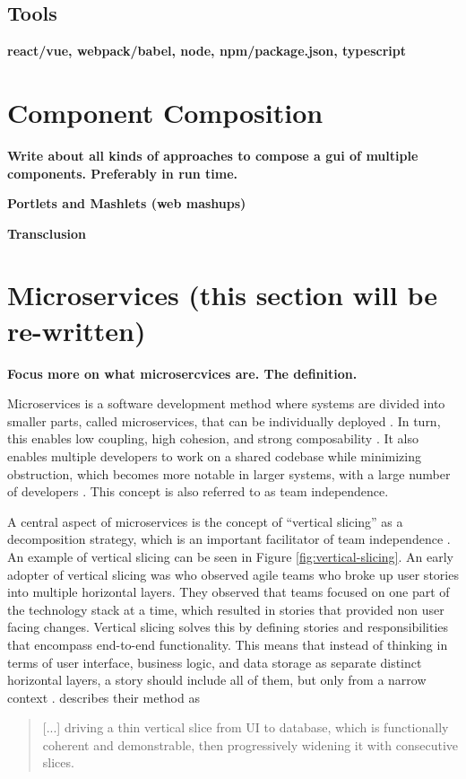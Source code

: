 \subsection{Tools}
\textbf{react/vue, webpack/babel, node, npm/package.json, typescript}

\section{Component Composition}

\textbf{Write about all kinds of approaches to compose a gui of multiple components. Preferably in run time.}

\textbf{Portlets and Mashlets (web mashups)}

\textbf{Transclusion}

\section{Microservices (this section will be re-written)}

\textbf{Focus more on what microsercvices are. The definition.}

Microservices is a software development method where systems are divided into smaller parts, called microservices, that can be individually deployed \cite{Newman2015a}. In turn, this enables low coupling, high cohesion, and strong composability \cite[ch.~1]{Newman2015a}. It also enables multiple developers to work on a shared codebase while minimizing obstruction, which becomes more notable in larger systems, with a large number of developers \cite{Newman2015a}. This concept is also referred to as team independence.


A central aspect of microservices is the concept of ``vertical slicing'' as a decomposition strategy, which is an important facilitator of team independence \cite{Familiar2015}. An example of vertical slicing can be seen in Figure \ref{fig:vertical-slicing}. An early adopter of vertical slicing was \citeauthor{Ratner2011} who observed agile teams who broke up user stories into multiple horizontal layers. They observed that teams focused on one part of the technology stack at a time, which resulted in stories that provided non user facing changes. Vertical slicing solves this by defining stories and responsibilities that encompass end-to-end functionality. This means that instead of thinking in terms of user interface, business logic, and data storage as separate distinct horizontal layers, a story should include all of them, but only from a narrow context \cite{Ratner2011}. \citeauthor{Ratner2011} describes their method as \blockquote{[...] driving a thin vertical slice from UI to database, which is functionally coherent and demonstrable, then progressively widening it with consecutive slices. \cite{Ratner2011}}

